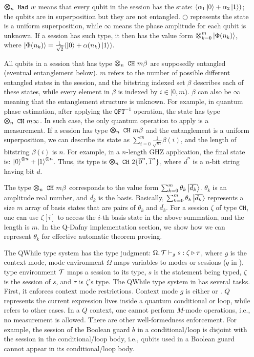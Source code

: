 $\ttype{n}{\thad{w}}$ means that every qubit in the session has the state: $(\alpha_1\left\vert{0}\right\rangle + \alpha_2\left\vert{1}\right\rangle)$;
the qubits are in superposition but they are not entangled.
$\bigcirc$ represents the state is a uniform superposition,
while $\infty$ means the phase amplitude for each qubit is unknown.
If a session has such type, it then has the value form $\Motimes_{k=0}^{m}\ket{\Phi(n_k)}$,
where $\left\vert{\Phi(n_k)}\right\rangle=\frac{1}{\sqrt{2}}(\left\vert{0}\right\rangle+\alpha(n_k)\left\vert{1}\right\rangle)$.

All qubits in a session that has type $\ttype{n}{\tch{m}{\beta}}$ are supposedly entangled (eventual entanglement below).
$m$ refers to the number of possible different entangled states in the session,
and the bitstring indexed set $\beta$ describes each of these states, while every element in $\beta$ is indexed by $i\in [0,m)$.
$\beta$ can also be $\infty$ meaning that the entanglement structure is unknown.
For example, in quantum phase estimation, after applying the $\texttt{QFT}^{-1}$ operation, the state has type $\ttype{n}{\tch{m}{\infty}}$. In such case, the only quantum operation to apply is a measurement.
If a session has type $\ttype{n}{\tch{m}{\beta}}$ and the entanglement is a uniform superposition,
we can describe its state as $\sum_{i=0}^{m}{\frac{1}{\sqrt{m}}\beta(i)}$, and the length of bitstring $\beta(i)$ is $n$.
For example, in a $n$-length GHZ application, the final state is: $\left\vert{0}\right\rangle^{\otimes n}+\left\vert{1}\right\rangle^{\otimes n}$. 
Thus, its type is $\ttype{n}{\tch{2}{\{\overline{0}^n,\overline{1}^n\}}}$, where $\overline{d}^n$ is a $n$-bit string having bit $d$.

The type $\ttype{n}{\tch{m}{\beta}}$ corresponds to the value form $\sum_{k=0}^{m}\theta_k\left\vert{\overline{d_k}}\right\rangle$.
$\theta_k$ is an amplitude real number, and $\overline{d_k}$ is the basis.
Basically, $\sum_{k=0}^{m}\theta_k\left\vert{\overline{d_k}}\right\rangle$ represents a size $m$ array of basis states
that are pairs of $\theta_k$ and $\overline{d_k}$. For a session $\zeta$ of type $\texttt{CH}$,
one can use $\zeta[i]$ to access the $i$-th basis state in the above summation, and the length is $m$.
In the Q-Dafny implementation section, we show how we can represent $\theta_k$ for effective automatic theorem proving.

The QWhile type system has the type judgment: $\Omega,\mathcal{T}\vdash_g s : \zeta\triangleright \tau$, where $g$ is the context mode, mode environment $\Omega$ maps variables to modes or sessions ($q$ in ), type environment $\mathcal{T}$ maps a session to its type, $s$ is the statement being typed, $\zeta$ is the session of $s$, and $\tau$ is $\zeta$'s type. 
The QWhile type system in  has several tasks. First, it enforces context mode restrictions.
Context mode $g$ is either \cmode or \qmode.
$Q$ represents the current expression lives inside a quantum conditional or loop, while \cmode refers to other cases.
In a $Q$ context, one cannot perform $M$-mode operations, i.e., no measurement is allowed.
There are other well-formedness enforcement. For example,
the session of the Boolean guard $b$ in a conditional/loop is disjoint with the session in the conditional/loop body,
i.e., qubits used in a Boolean guard cannot appear in its conditional/loop body.

